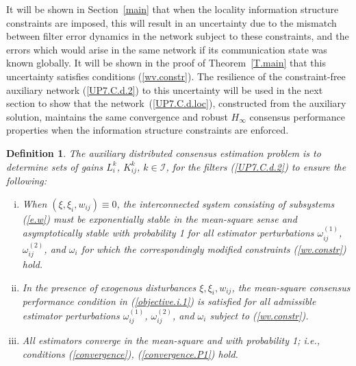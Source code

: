 \documentclass[a4paper,twocolumn]{autart}
\newtheorem{definition}{Definition}
\begin{document}
It will be shown in Section~\ref{main}
that when the locality information structure constraints are imposed,
this will result in an uncertainty due to the mismatch between filter error
dynamics in the network subject to these constraints, and 
the errors which would arise in the same network if its communication state was
known globally. It will be shown
in the proof of 
Theorem~\ref{T.main} that this uncertainty satisfies conditions
(\ref{wv.constr}). The resilience of the constraint-free auxiliary network 
(\ref{UP7.C.d.2}) to this uncertainty will be used in the next section to
show that the
network~(\ref{UP7.C.d.loc}), constructed from the auxiliary solution,
maintains the same convergence and robust $H_\infty$ consensus performance
properties when the information structure constraints are enforced.    

\begin{definition}\label{Def1.aux}
The auxiliary distributed consensus estimation problem is to
determine sets of gains
$L_i^k$, 
$K_{ij}^k$, $k\in\mathcal{I}$, for the filters 
(\ref{UP7.C.d.2}) to ensure the following:
\begin{enumerate}[(i)]
  \item
When $(\xi,\xi_i,w_{ij})\equiv 0$, the interconnected system consisting of
subsystems (\ref{e.w}) must be exponentially stable in the mean-square
sense and asymptotically 
stable with probability 1 for all estimator perturbations $\omega_{ij}^{(1)}$,
$\omega_{ij}^{(2)}$, and $\omega_i$ for which the correspondingly modified
constraints (\ref{wv.constr}) hold. 

\item
In the presence of exogenous disturbances $\xi,\xi_i,w_{ij}$, the
mean-square consensus 
performance condition in (\ref{objective.i.1}) is satisfied for all
admissible estimator perturbations  $\omega_{ij}^{(1)}$,
$\omega_{ij}^{(2)}$, and $\omega_i$ subject to (\ref{wv.constr}).

\item
 All estimators converge in the mean-square and with probability 1; i.e.,
 conditions (\ref{convergence}), (\ref{convergence.P1}) hold. 
\end{enumerate} 
\end{definition}
\end{document}
